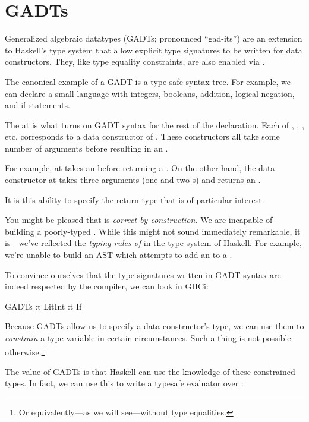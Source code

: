 \documentclass[book.tex]{subfiles}
\begin{document}
\section{GADTs}
\label{GADTs}

Generalized algebraic datatypes (GADTs; pronounced ``gad-its'') are an extension
to Haskell's type system that allow explicit type signatures to be written for
data constructors. They, like type equality constraints, are also enabled via
.

The canonical example of a GADT is a type safe syntax tree. For example, we can
declare a small language with integers, booleans, addition, logical negation,
and if statements.


The  at  is what turns on GADT syntax for the rest of the
declaration. Each of , , , etc. corresponds to a
data constructor of . These constructors all take some number of
arguments before resulting in an .

For example,  at  takes an  before returning a
. On the other hand, the data constructor  at  takes
three arguments (one  and two s) and returns an
.

It is this ability to specify the return type that is of particular interest.

You might be pleased that  is \emph{correct by
construction.} We are incapable of building a
poorly-typed . While this might not sound immediately remarkable, it
is---we've reflected the \emph{typing rules of } in the type system of
Haskell. For example, we're unable to build an AST which attempts to add an
 to a .

To convince ourselves that the type signatures written in GADT syntax are indeed
respected by the compiler, we can look in GHCi:

\begin{dorepl}{GADTs}
:t LitInt
:t If
\end{dorepl}

Because GADTs allow us to specify a data constructor's type, we can use them to
\emph{constrain} a type variable in certain circumstances. Such a thing is not
possible otherwise.\footnote{Or equivalently---as we will see---without type
equalities.}

The value of GADTs is that Haskell can use the knowledge of these constrained
types. In fact, we can use this to write a typesafe evaluator over :
\end{document}
